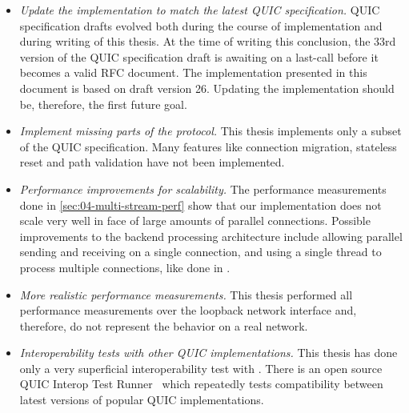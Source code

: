 \begin{itemize}

  \item \textit{Update the implementation to match the latest QUIC specification.} QUIC
        specification drafts evolved both during the course of implementation and during writing of
        this thesis. At the time of writing this conclusion, the 33rd version of the QUIC
        specification draft is awaiting on a last-call before it becomes a valid RFC document. The
        implementation presented in this document is based on draft version 26. Updating the
        implementation should be, therefore, the first future goal.

  \item \textit{Implement missing parts of the protocol.} This thesis implements only a subset of
        the QUIC specification. Many features like connection migration, stateless reset and path
        validation have not been implemented.

  \item \textit{Performance improvements for scalability.} The performance measurements done in
        \autoref{sec:04-multi-stream-perf} show that our implementation does not scale very well in
        face of large amounts of parallel connections. Possible improvements to the backend
        processing architecture include allowing parallel sending and receiving on a single
        connection, and using a single thread to process multiple connections, like done in
        \libmsquic{}.

  \item \textit{More realistic performance measurements.} This thesis performed all performance
        measurements over the loopback network interface and, therefore, do not represent the
        behavior on a real network.

  \item \textit{Interoperability tests with other QUIC implementations.} This thesis has done only a
        very superficial interoperability test with \libmsquic{}. There is an open source QUIC
        Interop Test Runner~\cite{QuicInteropRunner} which repeatedly tests compatibility between
        latest versions of popular QUIC implementations.

\end{itemize}
